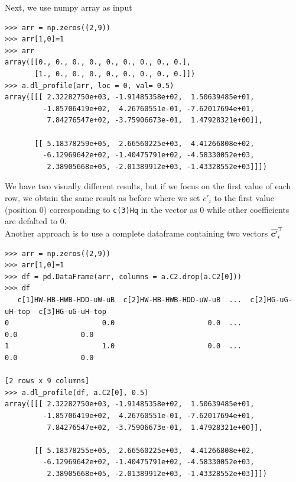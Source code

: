 \documentclass[12pt]{article}
\def\b#1{\boldsymbol{\rm #1}}
\begin{document}
Next, we use numpy array as input
\begin{verbatim}
>>> arr = np.zeros((2,9))
>>> arr[1,0]=1
>>> arr
array([[0., 0., 0., 0., 0., 0., 0., 0., 0.],
       [1., 0., 0., 0., 0., 0., 0., 0., 0.]])
>>> a.dl_profile(arr, loc = 0, val= 0.5)
array([[[ 2.32282750e+03, -1.91485358e+02,  1.50639485e+01,
         -1.85706419e+02,  4.26760551e-01, -7.62017694e+01,
          7.84276547e+02, -3.75906673e-01,  1.47928321e+00]],

       [[ 5.18378259e+05,  2.66560225e+03,  4.41266808e+02,
         -6.12969642e+02, -1.40475791e+02, -4.58330052e+03,
          2.38905668e+05, -2.01389912e+03, -1.43328552e+03]]])
\end{verbatim}
We have two visually different results, but if we focus on the first value of each row, we obtain the same result as before where we set $c'_i$ to the first value (position 0) corresponding to \verb|c(3)Hq| in the vector as 0 while other coefficients are defalted to 0.\\
Another approach is to use a complete dataframe containing two vectors $\overline{\b c'}_i^\top$
\begin{verbatim}
>>> arr = np.zeros((2,9))
>>> arr[1,0]=1
>>> df = pd.DataFrame(arr, columns = a.C2.drop(a.C2[0]))
>>> df
   c[1]HW-HB-HWB-HDD-uW-uB  c[2]HW-HB-HWB-HDD-uW-uB  ...  c[2]HG-uG-uH-top  c[3]HG-uG-uH-top
0                      0.0                      0.0  ...               0.0               0.0
1                      1.0                      0.0  ...               0.0               0.0

[2 rows x 9 columns]
>>> a.dl_profile(df, a.C2[0], 0.5)
array([[[ 2.32282750e+03, -1.91485358e+02,  1.50639485e+01,
         -1.85706419e+02,  4.26760551e-01, -7.62017694e+01,
          7.84276547e+02, -3.75906673e-01,  1.47928321e+00]],

       [[ 5.18378255e+05,  2.66560225e+03,  4.41266808e+02,
         -6.12969642e+02, -1.40475791e+02, -4.58330052e+03,
          2.38905668e+05, -2.01389912e+03, -1.43328552e+03]]])
\end{verbatim}


 \clearpage
\end{document}
